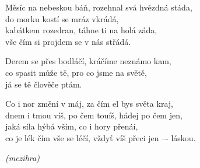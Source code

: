 
\ve{}
Měsíc na nebeskou báň, rozehnal svá hvězdná stáda,\\
do morku kostí se mráz vkrádá, \\
kabátkem rozedran, táhne ti na holá záda,\\
vše čím si projdem se v nás střádá.

\cho{}
Derem se přes bodláčí, kráčíme neznámo kam,\\
co spasit může tě, pro co jsme na světě,\\
já se tě člověče ptám.

Co i nor změní v máj, za čím el bys světa kraj,\\
dnem i tmou víš, po čem touíš, hádej po čem jen,\\
jaká síla hýbá vším, co i hory přenáí,\\
co je lék čím vše se léčí, vždyť víš přeci jen –- láskou.

\ve 
\textit{(mezihra)}

\cho{}

\esong{}
